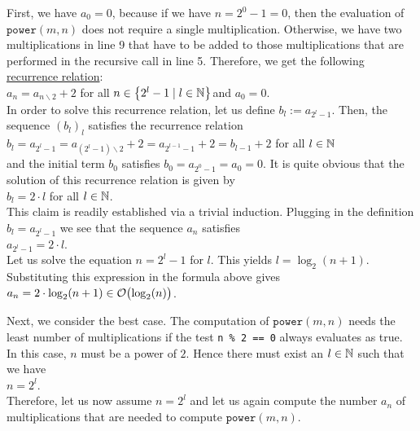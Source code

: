 First, we have $a_0 = 0$, because if we have $n = 2^0 - 1 = 0$, then the evaluation of 
$\mathtt{power}(m, n)$ does not require a single multiplication.
Otherwise, we have two multiplications in line 9 that have to be added to those multiplications
that are performed in the recursive call in line 5.  Therefore, we get the following
\href{http://en.wikipedia.org/wiki/Recurrence_relation}{recurrence relation}:
\\[0.2cm]
\hspace*{1.3cm}
$a_n = a_{n \backslash 2} + 2$ \qquad for all $n \in \left\{2^l - 1 \mid l \in {\mathbb N}\right\}$\quad and $a_0 = 0$. 
\\[0.2cm]
In order to solve this recurrence relation, let us define $b_l := a_{2^l-1}$.  Then, the sequence
$(b_l)_l$ 
satisfies the recurrence relation
 \\[0.2cm]
\hspace*{1.3cm} 
$b_l = a_{2^l-1} = a_{(2^l-1) \backslash 2} + 2 = a_{2^{l-1}-1} + 2 = b_{l-1} +2$ \qquad for all $l\in{\mathbb N}$
\\[0.2cm]
and the initial term $b_0$ satisfies $b_0 = a_{2^0-1} = a_0 = 0$.  It is quite obvious that the
solution of this recurrence relation is given by
\\[0.2cm]
\hspace*{1.3cm} $b_l = 2 \cdot l$ \qquad for all $l \in {\mathbb N}$. 
\\[0.2cm] 
This claim is readily established via a trivial induction.  Plugging in the definition $b_l = a_{2^l-1}$ we
see that the sequence $a_n$ satisfies \\[0.2cm]
\hspace*{1.3cm} $a_{2^l-1} = 2 \cdot l$. 
\\[0.2cm]
Let us solve the equation $n = 2^l - 1$ for $l$.  This yields
 $l =
\log_2(n+1)$.  Substituting this expression in the formula above gives \\[0.2cm]
\hspace*{1.3cm} $a_n = 2 \cdot \log_2(n+1) \in \mathcal{O}\bigl(\log_2(n)\bigr)$.
\vspace*{0.3cm}

Next, we consider the best case.  The computation of
$\mathtt{power}(m,n)$ needs the least number of multiplications if the test 
\texttt{n \% 2 == 0} always evaluates as true.  In this case, $n$ must be a power of $2$.  
Hence there must exist an $l\in {\mathbb N}$ such that we have
 \\[0.2cm]
\hspace*{1.3cm} $n = 2^l$.
 \\[0.2cm]
Therefore, let us now assume $n = 2^l$ and let us again compute the number $a_n$ of multiplications
that are needed to compute $\mathtt{power}(m,n)$. 

